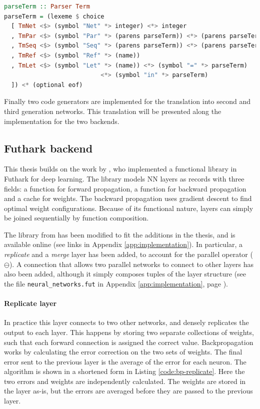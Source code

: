 \begin{lstlisting}[language=Haskell,name=The main component of the text parser
for Volr.,label={code:parser}]
parseTerm :: Parser Term
parseTerm = (lexeme $ choice
  [ TmNet <$> (symbol "Net" *> integer) <*> integer
  , TmPar <$> (symbol "Par" *> (parens parseTerm)) <*> (parens parseTerm)
  , TmSeq <$> (symbol "Seq" *> (parens parseTerm)) <*> (parens parseTerm)
  , TmRef <$> (symbol "Ref" *> (name))
  , TmLet <$> (symbol "Let" *> (name)) <*> (symbol "=" *> parseTerm)
                           <*> (symbol "in" *> parseTerm)
  ]) <* (optional eof)
\end{lstlisting}

Finally two code generators are implemented for the translation into
second and third generation networks.
This translation will be presented along the implementation
for the two backends.

\subsection{Futhark backend} \label{sec:volr-futhark}
This thesis builds on the work by \textcite{Minh2018}, who 
implemented a functional library in Futhark for deep learning.
The library models \gls{NN} layers as records with three fields:
a function for forward propagation, a function for backward propagation
and a cache for weights. 
The backward propagation uses gradient descent to find optimal
weight configurations.
Because of its functional nature, layers can simply be joined 
sequentially by function composition.

The library from \cite{Minh2018} has been modified to fit the
additions in the thesis, and is available online (see links in 
Appendix \ref{app:implementation}).
In particular, a \textit{replicate} and a \textit{merge} layer has
been added, to account for the parallel operator ($\ominus$).
A connection that allows two parallel networks to connect to other
layers has also been added, although it simply composes tuples of
the layer structure (see the file \texttt{neural\_networks.fut} in
Appendix \ref{app:implementation}, page \pageref{app:implementation_fut_nn}).

\paragraph{Replicate layer}
In practice this layer connects to two other networks, and densely
replicates the output to each layer.
This happens by storing two separate collections of weights, such
that each forward connection is assigned the correct value.
Backpropagation works by calculating the error correction on the
two sets of weights. The final error sent to the previous layer
is the average of the error for each neuron. 
The algorithm is shown in a shortened form in Listing \ref{code:bp-replicate}.
Here the two errors and weights are independently calculated.
The weights are stored in the layer as-is, but the errors are 
averaged before they are passed to the previous layer.

